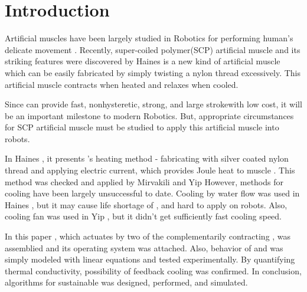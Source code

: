 
\section{Introduction}
Artificial muscles have been largely studied in Robotics for performing human's delicate movement \cite{ashley}. Recently, super-coiled polymer(SCP) artificial muscle and its striking features were discovered by Haines \etal \cite{haines} \scp is a new kind of artificial muscle which can be easily fabricated by simply twisting a nylon thread excessively. This artificial muscle contracts when heated and relaxes when cooled.

Since \scp can provide fast\cite{mirvakili}, nonhysteretic\needcitation, strong\needcitation, and large stroke\needcitation with low cost\cite{yip}, it will be an important milestone to modern Robotics. But, appropriate circumstances for SCP artificial muscle must be studied to apply this artificial muscle into robots.

In Haines \etal, it presents \scp 's heating method - fabricating \scp with silver coated nylon thread and applying electric current, which provides Joule heat to muscle \cite{haines}. This method was checked and applied by Mirvakili \etal and Yip \etal \cite{yip, mirvakili} However, methods for cooling \scp have been largely unsuccessful to date. Cooling by water flow was used in Haines \etal, but it may cause life shortage of \scp \cite{haines}, and hard to apply on robots. Also, cooling fan was used in Yip \etal, but it didn't get sufficiently fast cooling speed.

In this paper \antanospace, which actuates by two of the complementarily contracting \scpnospace, was assemblied and its operating system was attached. Also, behavior of \scp and \anta was simply modeled with linear equations and tested experimentally. By quantifying thermal conductivity, possibility of feedback cooling was confirmed. In conclusion, algorithms for sustainable \apc was designed, performed, and simulated.